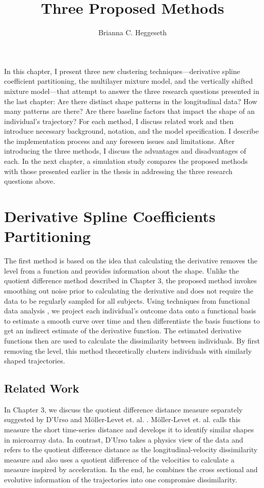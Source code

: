 \documentclass[12pt]{article}
\title{Three Proposed Methods}
\author{Brianna C. Heggeseth}
\begin{document}
\doublespace
\maketitle
\noindent In this chapter, I present three new clustering techniques---derivative spline coefficient partitioning, the multilayer mixture model, and the vertically shifted mixture model---that attempt to answer the three research questions presented in the last chapter: Are there distinct shape patterns in the longitudinal data? How many patterns are there? Are there baseline factors that impact the shape of an individual's trajectory? For each method, I discuss related work and then introduce necessary background, notation, and the model specification. I describe the implementation process and any foreseen issues and limitations. After introducing the three methods, I discuss the advantages and disadvantages of each. In the next chapter, a simulation study compares the proposed methods with those presented earlier in the thesis in addressing the three research questions above.
\section{Derivative Spline Coefficients Partitioning}
The first method is based on the idea that calculating the derivative removes the level from a function and provides information about the shape. Unlike the quotient difference method described in Chapter 3,  the proposed method invokes smoothing out noise prior to calculating the derivative and does not require the data to be regularly sampled for all subjects. Using techniques from functional data analysis \cite{ramsay2002}, we project each individual's outcome data onto a functional basis to estimate a smooth curve over time and then differentiate the basis functions to get an indirect estimate of the derivative function. The estimated derivative functions then are used to calculate the dissimilarity between individuals. By first removing the level, this  method theoretically clusters individuals with similarly shaped trajectories.
\subsection{Related Work}
In Chapter 3, we discuss the quotient difference distance measure separately suggested by D'Urso and M{\"o}ller-Levet et. al. \cite{d2000,moller2003}. M{\"o}ller-Levet et. al. calls this measure the short time-series distance and develops it to identify similar shapes in microarray data. In contrast, D'Urso takes a physics view of the data and refers to the quotient difference distance as the longitudinal-velocity dissimilarity measure and also uses a quotient difference of the velocities to calculate a measure inspired by acceleration. In the end, he combines the cross sectional and evolutive information of the trajectories into one compromise dissimilarity.\\
\end{document}
